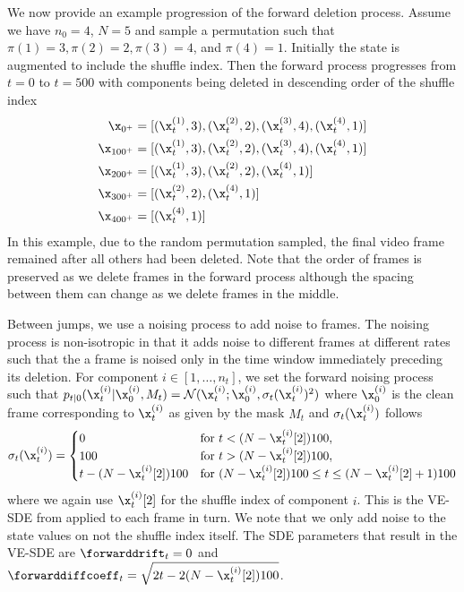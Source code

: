 We now provide an example progression of the forward deletion process. Assume we have $n_0=4$, $N=5$ and sample a permutation such that $\pi(1)=3, \pi(2)=2, \pi(3)=4$, and $\pi(4)=1$. Initially the state is augmented to include the shuffle index. Then the forward process progresses from $t=0$ to $t=500$ with components being deleted in descending order of the shuffle index
\begin{align}
    \x_{0^+}&=[(\x^{(1)}_{t}, 3), (\x^{(2)}_{t}, 2), (\x^{(3)}_{t}, 4), (\x^{(4)}_{t}, 1)]\\
    \x_{100^+} &= [(\x^{(1)}_{t}, 3), (\x^{(2)}_{t}, 2), (\x^{(3)}_{t}, 4), (\x^{(4)}_{t}, 1)]\\
    \x_{200^+} &= [(\x^{(1)}_{t}, 3), (\x^{(2)}_{t}, 2), (\x^{(4)}_{t}, 1)]\\
    \x_{300^+} &= [(\x^{(2)}_{t}, 2), (\x^{(4)}_{t}, 1)]\\
    \x_{400^+} &= [(\x^{(4)}_{t}, 1)]\\
\end{align}
In this example, due to the random permutation sampled, the final video frame remained after all others had been deleted. Note that the order of frames is preserved as we delete frames in the forward process although the spacing between them can change as we delete frames in the middle.


Between jumps, we use a noising process to add noise to frames. The noising process is non-isotropic in that it adds noise to different frames at different rates such that the a frame is noised only in the time window immediately preceding its deletion. For component $i \in [1, \dots, n_t]$, we set the forward noising process such that $p_{t|0}(\x_t^{(i)} | \x_0^{(i)}, M_t) = \mathcal{N}(\x_t^{(i)}; \x_0^{(i)}, \sigma_t(\x_t^{(i)})^2)$ where $\x_0^{(i)}$ is the clean frame corresponding to $\x_t^{(i)}$ as given by the mask $M_t$ and $\sigma_t(\x_t^{(i)})$ follows
\begin{equation}
    \sigma_t(\x_t^{(i)}) = \begin{cases}
        0 & \text{for } t < (N - \x_t^{(i)}[2]) 100,\\
        100 & \text{for } t > (N - \x_t^{(i)}[2]) 100,\\
        t - (N - \x_t^{(i)}[2])100 & \text{for } (N - \x_t^{(i)}[2])100 \leq t \leq (N - \x_t^{(i)}[2]+1) 100
    \end{cases}
\end{equation}
where we again use $\x_t^{(i)}[2]$ for the shuffle index of component $i$. This is the VE-SDE from \cite{song2020score} applied to each frame in turn. We note that we only add noise to the state values on not the shuffle index itself. The SDE parameters that result in the VE-SDE are $\forwarddrift_t = 0$ and $\forwarddiffcoeff_t = \sqrt{2t - 2(N - \x_t^{(i)}[2])100}$.



